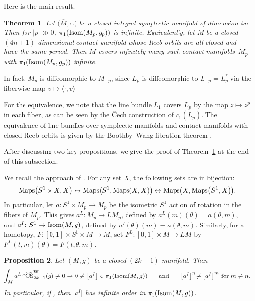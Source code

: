 \documentclass[pdftex]{sigma}
\numberwithin{equation}{section}
\newtheorem{Theorem}{Theorem}[section]
\newtheorem{Proposition}[Theorem]{Proposition}
\theoremstyle{definition}
\newcommand{\maps}{{\rm Maps} }
\newcommand{\bm}{ M}
\newcommand{\ocs}{\widetilde{{\rm CS}}}
\newcommand{\om}{\overline{M}}
\newcommand{\omp}{M_p}
\newcommand{\isom}{{\rm Isom}}
\newcommand{\ism}{\isom}
\begin{document}
 Here is the main result.

\begin{Theorem} \label{thm:main} Let $\bigl(\om,\omega\bigr)$ be a closed integral symplectic manifold of dimension $4n$.
Then for $|p| \gg 0 $,
 $\pi_1({\rm Isom}(\omp,g_p))$ is infinite. Equivalently, let $M$ be a closed $(4n+1)$-dimensional contact manifold whose Reeb orbits are all closed and have the same period. Then $M$ covers infinitely many such contact manifolds~$\omp$ with
$\pi_1({\rm Isom}(\omp,g_p))$ infinite.
\end{Theorem}

In fact, $\omp$ is diffeomorphic to $M_{-p}$, since $L_p$ is diffeomorphic to $L_{-p} = L_p^*$
via the fiberwise map $v\mapsto \langle \cdot, v\rangle$.

 For the equivalence, we note that the line bundle $L_1$ covers $L_p$ by the map $z\mapsto z^p$ in each fiber, as can be seen by the \v{C}ech construction of $c_1(L_p)$. The equivalence of line bundles over symplectic manifolds and contact manifolds with closed Reeb orbits is given by the Boothby--Wang fibration theorem
\cite[Theorem~3.9]{Blair}.

After discussing two key propositions, we give the proof of Theorem~\ref{thm:main} at the end of this subsection.

We recall the approach of \cite{MRT4}. For any set $X$, the following sets are in bijection:
\[
\maps\bigl(S^1\times X,X\bigr)\leftrightarrow \maps\bigl(S^1, \maps(X,X)\bigr)\leftrightarrow \maps\bigl(X, \maps\bigl(S^1,X\bigr)\bigr).
\]
In particular, let $a\colon S^1\times \omp\to\omp$ be the isometric $S^1$ action of rotation in the fibers of $\omp$. This gives
$a^L\colon \omp\to L\omp$, defined by $a^L(m)(\theta) = a(\theta,m)$, and
$a^I\colon S^1\to\ism(M,g)$, defined by $a^I(\theta)(m) = a(\theta,m)$.
Similarly, for a homotopy,
$F\colon [0,1]\times S^1\times \bm\to \bm$, set
$F^L\colon [0,1]\times \bm\to L\bm$ by $ F^L(t,m)(\theta) = F(t,\theta, m)$.



\begin{Proposition}\label{customprop:app} Let $(\bm,g)$ be a closed $(2k-1)$-manifold. Then
\begin{gather*}
\int_{\bm} a^{L,*}\ocs^{\rm W}_{2k-1}(g) \neq 0 \Rightarrow 0\neq \bigl[a^I\bigr]\in \pi_1(\isom(\bm,g))
\qquad\! {\rm and}\qquad\! \bigl[a^I\bigr]^n\! \neq \bigl[a^I\bigr]^m\ {\rm for} \ m\neq n.
\end{gather*}
In particular, if \smash{$\int_{\bm} a^{L,*}\ocs{}^{\rm W}_{2k-1}(g) \neq 0$}, then $\bigl[a^I\bigr]$ has infinite order in $\pi_1(\ism(M,g))$.
\end{Proposition}
\end{document}
